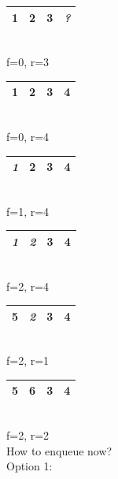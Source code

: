 \documentclass[nobib]{tufte-handout}
\begin{document}
\begin{table}
    \centering
    \begin{tabular}{|c|c|c|c|}
        \hline
        \cellcolor{cyan}\textbf{1} & \cellcolor{cyan}\textbf{2} & \cellcolor{cyan}\textbf{3} & \textit{?} \\
        \hline
    \end{tabular}\\
    f=0, r=3\\
    \begin{tabular}{|c|c|c|c|}
        \hline
        \cellcolor{cyan}\textbf{1} & \cellcolor{cyan}\textbf{2} & \cellcolor{cyan}\textbf{3} & \cellcolor{cyan}\textbf{4} \\
        \hline
    \end{tabular}\\
    f=0, r=4\\
    \begin{tabular}{|c|c|c|c|}
        \hline
        \textit{1} & \cellcolor{cyan}\textbf{2} & \cellcolor{cyan}\textbf{3} & \cellcolor{cyan}\textbf{4} \\
        \hline
    \end{tabular}\\
    f=1, r=4\\
    \begin{tabular}{|c|c|c|c|}
        \hline
        \textit{1} & \textit{2} & \cellcolor{cyan}\textbf{3} & \cellcolor{cyan}\textbf{4} \\
        \hline
    \end{tabular}\\
    f=2, r=4\\
    \begin{tabular}{|c|c|c|c|}
        \hline
        \cellcolor{cyan}\textbf{5} & \textit{2} & \cellcolor{cyan}\textbf{3} & \cellcolor{cyan}\textbf{4} \\
        \hline
    \end{tabular}\\
    f=2, r=1\\
    \begin{tabular}{|c|c|c|c|}
        \hline
        \cellcolor{cyan}\textbf{5} & \cellcolor{cyan}\textbf{6} & \cellcolor{cyan}\textbf{3} & \cellcolor{cyan}\textbf{4} \\
        \hline
    \end{tabular}\\
    f=2, r=2\\
    How to enqueue now?\\
    Option 1:\\

\end{table}
\end{document}
